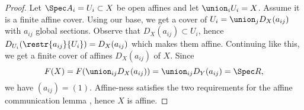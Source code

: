 
\begin{proof}
Let $\Spec A_i = U_i \subset X$ be open affines
and let $\union_i U_i = X$.
Assume it is a finite affine cover.
Using our base, 
we get a cover of $U_i = \union_j D_X(a_{ij})$ 
with $a_{ij}$ global sections.
Observe that $D_X(a_{ij})\subset U_i$, 
hence $D_{U_i}(\restr{a_{ij}}{U_i}) = D_X(a_{ij})$
which makes them affine.
Continuing like this, 
we get a finite cover of affines $D_X(a_{ij})$ of $X$.
Since 
\[ F(X) = F(\union_{ij} D_X(a_{ij})) = \union_{ij} D_Y(a_{ij}) = \Spec R,\]
we have $(a_{ij})=(1)$.
Affine-ness satisfies the two requirements for the affine communication lemma \cite[Ex.2.17]{harts}, 
hence $X$ is affine.
\end{proof}